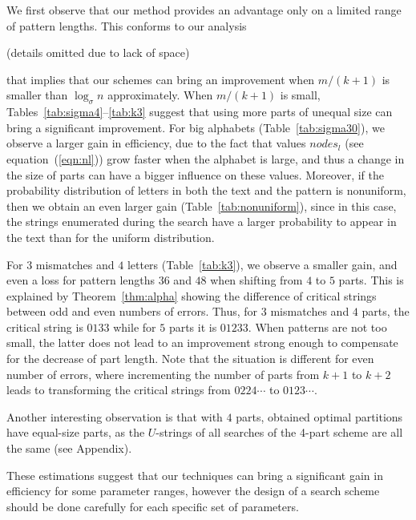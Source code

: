 \documentclass[12pt]{article}
\newcommand{\numnodes}[1]{\mathit{nodes}_{#1}}
\newif\iffull
\begin{document}
We first observe that our method provides an advantage
only on a limited range of pattern lengths. This conforms to our analysis 
\iffull
(see Section~\ref{sec:uneven})
\else
(details omitted due to lack of space)
\fi
that implies that our schemes can bring an improvement when $m/(k+1)$ is smaller than
$\log_{\sigma} n$ approximately. 
When $m/(k+1)$ is small, Tables~\ref{tab:sigma4}--\ref{tab:k3} suggest that
using more parts of unequal size can
bring a significant improvement. 
For big alphabets (Table~\ref{tab:sigma30}),
we observe a larger gain in efficiency,
due to the fact that values 
$\numnodes{l}$ (see equation~(\ref{eqn:nl})) grow faster when the
alphabet is large, and thus a change in the size of parts can
have a bigger influence on these values.
Moreover, if the probability distribution of letters in both the text and
the pattern is nonuniform,
then we obtain an even larger gain (Table~\ref{tab:nonuniform}), since in this case, the
strings enumerated during the search have a larger probability to
appear in the text than for the uniform distribution. 


For $3$ mismatches and $4$ letters (Table~\ref{tab:k3}), 
we observe a smaller gain, and even a loss for pattern lengths $36$ and
$48$ when shifting from $4$ to $5$ parts.
This is explained by Theorem~\ref{thm:alpha} showing the
difference of critical strings between odd and even numbers of
errors. 
Thus, for $3$ mismatches and $4$ parts, the
critical string is $0133$ 
while for $5$ parts it is $01233$. 
When patterns are not too small, the latter does not lead to an improvement strong enough
to compensate for the decrease of part length. 
Note that the situation is different for even number of errors, where incrementing the number of parts from
$k+1$ to $k+2$ leads to transforming the critical strings from
$0224\cdots$ to $0123\cdots$. 

Another interesting observation is that with $4$ parts, obtained
optimal partitions have equal-size parts, as the $U$-strings
of all searches of the 4-part scheme are all the same (see Appendix). 



These estimations suggest that our techniques can 
bring a
significant gain in efficiency for some parameter ranges, however the
design of a search scheme should be done carefully for each specific
set of parameters.
\end{document}
